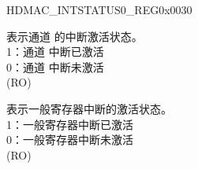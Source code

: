 \begin{register}{H}{DMAC\_INTSTATUS0\_REG}{0x0030}\label{regdesc:DMACINTSTATUS0REG}
%
%
%
%
%
%
%
\regnewline%
\begin{regdesc}\begin{reglist}
\label{fielddesc:DMACCH1INTSTAT}\item [DMAC\_CH\regindex{n}\_INTSTAT (\regindex{n}: 1-4)] 表示通道  的中断激活状态。\\
1：通道  中断已激活 \\
0：通道  中断未激活 \\
(RO)
\label{fielddesc:DMACCOMMONREGINTSTAT}\item [DMAC\_COMMONREG\_INTSTAT] 表示一般寄存器中断的激活状态。 \\
1：一般寄存器中断已激活 \\
0：一般寄存器中断未激活  \\
(RO)
\end{reglist}\end{regdesc}
\end{register}



